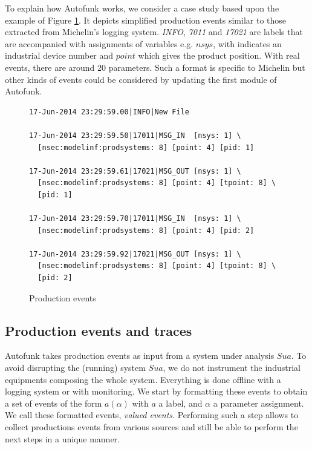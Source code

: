 To explain how Autofunk works, we consider a case study based
upon the example of Figure \ref{fig:rawdatum}. It depicts
simplified production events similar to those extracted from
Michelin's logging system. \textit{INFO}, \textit{7011} and
\textit{17021} are labels that are accompanied with assignments
of variables e.g. $nsys$, with indicates an industrial device
number and $point$ which gives the product position. With real
events, there are around 20 parameters. Such a format is specific
to Michelin but other kinds of events could be considered by
updating the first module of Autofunk.

\begin{figure}[ht]
\begin{framed}
\begin{BVerbatim}
17-Jun-2014 23:29:59.00|INFO|New File

17-Jun-2014 23:29:59.50|17011|MSG_IN  [nsys: 1] \
  [nsec:modelinf:prodsystems: 8] [point: 4] [pid: 1]

17-Jun-2014 23:29:59.61|17021|MSG_OUT [nsys: 1] \
  [nsec:modelinf:prodsystems: 8] [point: 4] [tpoint: 8] \
  [pid: 1]

17-Jun-2014 23:29:59.70|17011|MSG_IN  [nsys: 1] \
  [nsec:modelinf:prodsystems: 8] [point: 4] [pid: 2]

17-Jun-2014 23:29:59.92|17021|MSG_OUT [nsys: 1] \
  [nsec:modelinf:prodsystems: 8] [point: 4] [tpoint: 8] \
  [pid: 2]
\end{BVerbatim}
\end{framed}

\caption{Production events}
\label{fig:rawdatum}
\end{figure}

\subsection{Production events and traces}
\label{part3:collecting}

Autofunk takes production events as input from a system under
analysis $Sua$. To avoid disrupting the (running) system $Sua$,
we do not instrument the industrial equipments composing the
whole system. Everything is done offline with a logging system or
with monitoring. We start by formatting these events to obtain a
set of events of the form $a(\alpha)$ with $a$ a label, and
$\alpha$ a parameter assignment. We call these formatted events,
\textit{valued events}. Performing such a step allows to collect
productions events from various sources and still be able to
perform the next steps in a unique manner.

